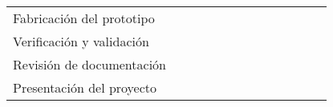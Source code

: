 \begin{table}[h]
\begin{center}
\begin{tabular}{|l|l|l|l|l|l|l|l|l|l|l|l|l|}
                                                &
                                                &
\cellcolor[HTML]{656565}{\color[HTML]{333333}}  &
\cellcolor[HTML]{656565}{\color[HTML]{333333}}  &
\cellcolor[HTML]{656565}{\color[HTML]{333333}}  &
                                                &
                                                &
                                                & \\ \hline
Fabricación del prototipo                                 &
                                                &
                                                &    
                                                &
                                                &
                                                &
                                                &
                                                &
                                                &
\cellcolor[HTML]{656565}{\color[HTML]{333333}}  &
                                                &
                                                & \\ \hline
Verificación y validación                &
                                                &
                                                &    
                                                &
                                                &
                                                &
                                                &
                                                &
                                                &   
\cellcolor[HTML]{656565}{\color[HTML]{333333}}  &
\cellcolor[HTML]{656565}{\color[HTML]{333333}}  &
                                                & \\ \hline
Revisión de documentación                &
                                                &                          
                                                &
                                                &
                                                &
                                                &
                                                &
                                                &
                                                &
                                                &            
\cellcolor[HTML]{656565}{\color[HTML]{333333}}  &
\cellcolor[HTML]{656565}{\color[HTML]{333333}}  & \\ \hline                                                
Presentación del proyecto                       &
                                                &
                                                &                          

\end{tabular}
\end{center}
\end{table}
